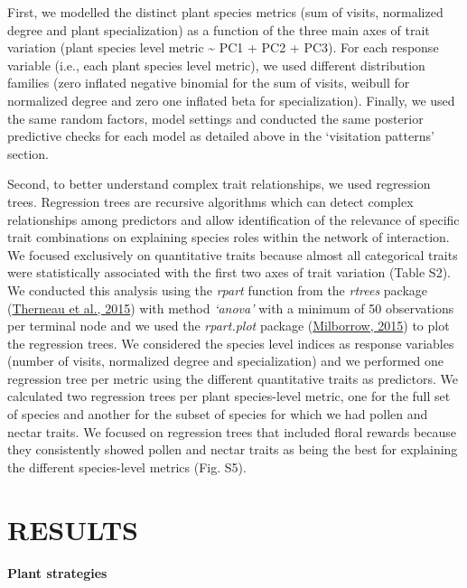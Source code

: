 \documentclass[
  12pt,
  a4paper,
]{article}
\begin{document}
First, we modelled the distinct plant species metrics (sum of visits, normalized degree and plant specialization) as a function of the three main axes of trait variation (plant species level metric \textasciitilde{} PC1 + PC2 + PC3). For each response variable (i.e., each plant species level metric), we used different distribution families (zero inflated negative binomial for the sum of visits, weibull for normalized degree and zero one inflated beta for specialization). Finally, we used the same random factors, model settings and conducted the same posterior predictive checks for each model as detailed above in the `visitation patterns' section.

Second, to better understand complex trait relationships, we used regression trees. Regression trees are recursive algorithms which can detect complex relationships among predictors and allow identification of the relevance of specific trait combinations on explaining species roles within the network of interaction. We focused exclusively on quantitative traits because almost all categorical traits were statistically associated with the first two axes of trait variation (Table S2). We conducted this analysis using the \emph{rpart} function from the \emph{rtrees} package (\protect\hyperlink{ref-therneau2015}{Therneau et al., 2015}) with method \emph{`anova'} with a minimum of 50 observations per terminal node and we used the \emph{rpart.plot} package (\protect\hyperlink{ref-milborrow2015}{Milborrow, 2015}) to plot the regression trees. We considered the species level indices as response variables (number of visits, normalized degree and specialization) and we performed one regression tree per metric using the different quantitative traits as predictors. We calculated two regression trees per plant species-level metric, one for the full set of species and another for the subset of species for which we had pollen and nectar traits. We focused on regression trees that included floral rewards because they consistently showed pollen and nectar traits as being the best for explaining the different species-level metrics (Fig. S5).

\hypertarget{results}{%
\section{RESULTS}\label{results}}

\textbf{Plant strategies}
\end{document}
